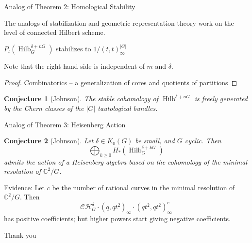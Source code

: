 \documentclass{beamer}
\DeclareMathOperator{\Hilb}{Hilb}
\newcommand{\C}{\mathbb{C}}
\newtheorem{conjecture}{Conjecture}
\begin{document}
\begin{frame}{Analog of Theorem 2: Homological Stability}

The analogs of stabilization and geometric representation theory work on the level of connected Hilbert scheme.

\begin{Theorem}[Johnson] 
$P_t(\Hilb^{\delta+nG}_G)$ stabilizes to $1/(t,t)_\infty^{|G|}$
\end{Theorem}
Note that the right hand side is independent of $m$ and $\delta$.
\begin{proof} Combinatorics -- a generalization of cores and quotients of partitions \end{proof}

\begin{conjecture}[Johnson] 
The stable cohomology of $\Hilb^{\delta+nG}$ is freely generated by the Chern classes of the $|G|$ tautological bundles.
\end{conjecture}

\end{frame}

\begin{frame}{Analog of Theorem 3:  Heisenberg Action}


\begin{conjecture}[Johnson]
Let $\delta\in K_0(G)$ be small, and $G$ cyclic.  Then
$$\bigoplus_{k\geq 0} H_*(\Hilb^{\delta+kG}_G)$$ admits the action of a Heisenberg algebra based on the cohomology of the minimal resolution of $\C^2/G$.
\end{conjecture}
\begin{block}{Evidence:}
Let $c$ be the number of rational curves in the minimal resolution of $\C^2/G$.  Then
$$\mathcal{CH}^\delta_G\cdot(q,qt^2)_\infty\cdot (qt^2,qt^2)_\infty^c$$
has positive coefficients; but higher powers start giving negative coefficients.

\end{block}

\end{frame}






\begin{frame}[plain,c]

\begin{center}

\Huge

Thank you

\end{center}

\end{frame}
\end{document}
